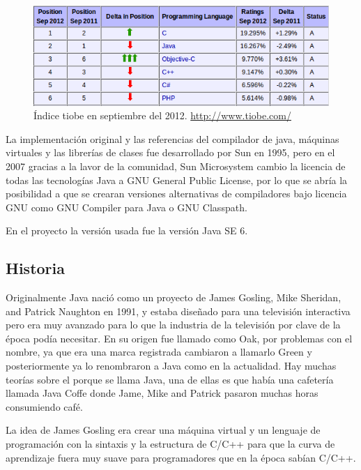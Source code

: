 \begin{figure}
  \centering
    \includegraphics[scale=0.9]{./ConocimientosPrevios/imagenes/indiceTiobe.png}
  \caption{Índice tiobe en septiembre del 2012. \url{http://www.tiobe.com/}}
  \label{fig:indicetiobe}
\end{figure} 

La implementación original y las referencias del compilador de java, máquinas virtuales y las librerías de clases fue desarrollado por Sun en 1995, pero en el 2007 gracias a la lavor de la comunidad, Sun Microsystem cambio la licencia de todas las tecnologías Java a GNU General Public License, por lo que se abría la posibilidad a que se crearan versiones alternativas de compiladores bajo licencia GNU como GNU Compiler para Java o GNU Classpath.

En el proyecto la versión usada fue la versión Java SE 6.

\subsection{Historia}

Originalmente Java nació como un proyecto de James Gosling, Mike Sheridan, and Patrick Naughton en 1991, y estaba diseñado para una televisión interactiva pero era muy avanzado para lo que la industria de la televisión por clave de la época podía necesitar. En su origen fue llamado como Oak, por problemas con el nombre, ya que era una marca registrada cambiaron a llamarlo Green y posteriormente ya lo renombraron a Java como en la actualidad. Hay muchas teorías sobre el porque se llama Java, una de ellas es que había una cafetería llamada Java Coffe donde Jame, Mike and Patrick pasaron muchas horas consumiendo café.

La idea de James Gosling era crear una máquina virtual y un lenguaje de programación con la sintaxis y la estructura de C/C++ para que la curva de aprendizaje fuera muy suave para programadores que en la época sabían C/C++.

